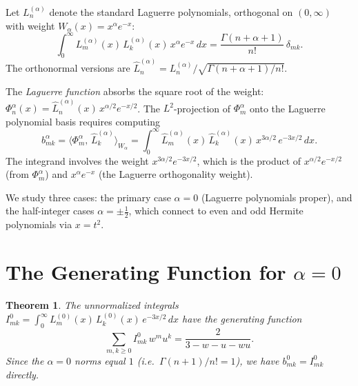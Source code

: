 \documentclass[11pt,a4paper]{article}
\theoremstyle{definition}
\theoremstyle{plain}
\newtheorem{theorem}[definition]{Theorem}
\begin{document}
Let $L_n^{(\alpha)}$ denote the standard Laguerre polynomials, orthogonal on
$(0,\infty)$ with weight $W_\alpha(x) = x^\alpha e^{-x}$:
\begin{equation}\label{eq:orth}
  \int_0^\infty L_m^{(\alpha)}(x)\,L_k^{(\alpha)}(x)\,x^\alpha e^{-x}\,dx
  = \frac{\Gamma(n+\alpha+1)}{n!}\,\delta_{mk}.
\end{equation}
The orthonormal versions are $\hat{L}_n^{(\alpha)} = L_n^{(\alpha)}/\sqrt{\Gamma(n+\alpha+1)/n!}$.

The \emph{Laguerre function} absorbs the square root of the weight:
$\Phi_n^\alpha(x) = \hat{L}_n^{(\alpha)}(x)\,x^{\alpha/2}e^{-x/2}$.
The $L^2$-projection of $\Phi_m^\alpha$ onto the Laguerre polynomial basis
requires computing
\begin{equation}\label{eq:bmk}
  b_{mk}^\alpha
  = \langle \Phi_m^\alpha,\,\hat{L}_k^{(\alpha)}\rangle_{W_\alpha}
  = \int_0^\infty \hat{L}_m^{(\alpha)}(x)\,\hat{L}_k^{(\alpha)}(x)\,
    x^{3\alpha/2}\,e^{-3x/2}\,dx.
\end{equation}
The integrand involves the weight $x^{3\alpha/2}e^{-3x/2}$, which is the
product of $x^{\alpha/2}e^{-x/2}$ (from $\Phi_m^\alpha$) and $x^\alpha e^{-x}$
(the Laguerre orthogonality weight).

We study three cases: the primary case $\alpha=0$ (Laguerre polynomials proper),
and the half-integer cases $\alpha = \pm\tfrac12$, which connect to
even and odd Hermite polynomials via $x = t^2$.

\section{The Generating Function for \texorpdfstring{$\alpha=0$}{alpha=0}}

\begin{theorem}\label{thm:gf}
The unnormalized integrals
$I_{mk}^0 = \int_0^\infty L_m^{(0)}(x)\,L_k^{(0)}(x)\,e^{-3x/2}\,dx$
have the generating function
\begin{equation}\label{eq:gf}
  \sum_{m,k\ge 0} I_{mk}^0\,w^m u^k
  = \frac{2}{3 - w - u - wu}.
\end{equation}
Since the $\alpha=0$ norms equal $1$ (i.e.\ $\Gamma(n+1)/n!=1$), we have
$b_{mk}^0 = I_{mk}^0$ directly.
\end{theorem}
\end{document}
